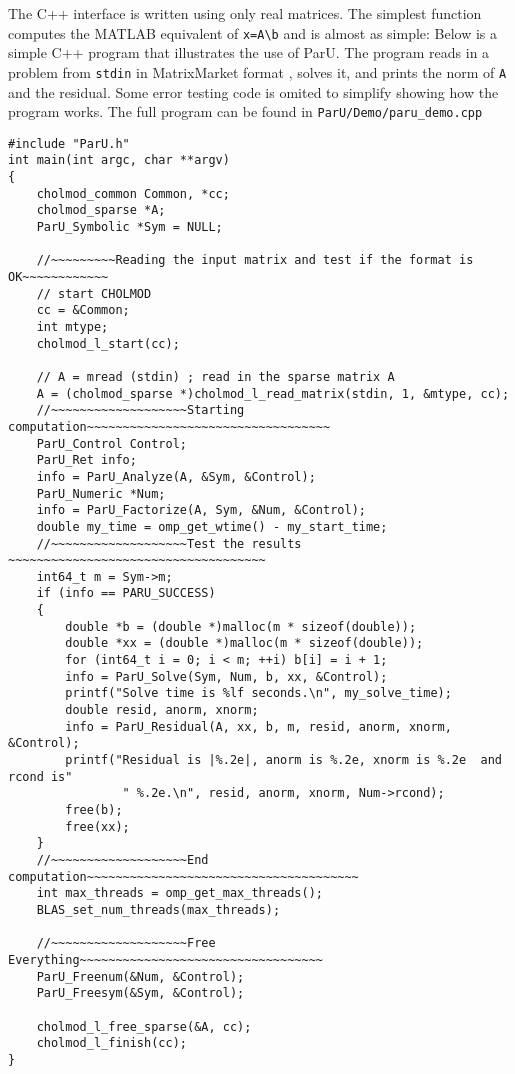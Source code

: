 \documentclass[12pt]{article}
\begin{document}
The C++ interface is written using only real matrices.  
The simplest function computes the MATLAB equivalent of
\verb'x=A\b' and is almost as simple:
Below is a simple C++ program that illustrates the use of ParU.  The
program reads in a problem from \verb'stdin' in MatrixMarket
format \cite{BoisvertPozoRemingtonBarrettDongarra97}, solves it, and prints the
norm of \verb'A' and the residual. 
Some error testing code is omited to simplify showing how the program works. 
The full program can be found in 
\verb'ParU/Demo/paru_demo.cpp'
\begin{verbatim}
#include "ParU.h"
int main(int argc, char **argv)
{
    cholmod_common Common, *cc;
    cholmod_sparse *A;
    ParU_Symbolic *Sym = NULL;

    //~~~~~~~~~Reading the input matrix and test if the format is OK~~~~~~~~~~~~
    // start CHOLMOD
    cc = &Common;
    int mtype;
    cholmod_l_start(cc);

    // A = mread (stdin) ; read in the sparse matrix A
    A = (cholmod_sparse *)cholmod_l_read_matrix(stdin, 1, &mtype, cc);
    //~~~~~~~~~~~~~~~~~~~Starting computation~~~~~~~~~~~~~~~~~~~~~~~~~~~~~~~~~~
    ParU_Control Control;
    ParU_Ret info;
    info = ParU_Analyze(A, &Sym, &Control);
    ParU_Numeric *Num;
    info = ParU_Factorize(A, Sym, &Num, &Control);
    double my_time = omp_get_wtime() - my_start_time;
    //~~~~~~~~~~~~~~~~~~~Test the results ~~~~~~~~~~~~~~~~~~~~~~~~~~~~~~~~~~~~
    int64_t m = Sym->m;
    if (info == PARU_SUCCESS)
    {
        double *b = (double *)malloc(m * sizeof(double));
        double *xx = (double *)malloc(m * sizeof(double));
        for (int64_t i = 0; i < m; ++i) b[i] = i + 1;
        info = ParU_Solve(Sym, Num, b, xx, &Control);
        printf("Solve time is %lf seconds.\n", my_solve_time);
        double resid, anorm, xnorm;
        info = ParU_Residual(A, xx, b, m, resid, anorm, xnorm, &Control);
        printf("Residual is |%.2e|, anorm is %.2e, xnorm is %.2e  and rcond is"
                " %.2e.\n", resid, anorm, xnorm, Num->rcond);
        free(b);
        free(xx);
    }
    //~~~~~~~~~~~~~~~~~~~End computation~~~~~~~~~~~~~~~~~~~~~~~~~~~~~~~~~~~~~~
    int max_threads = omp_get_max_threads();
    BLAS_set_num_threads(max_threads);

    //~~~~~~~~~~~~~~~~~~~Free Everything~~~~~~~~~~~~~~~~~~~~~~~~~~~~~~~~~~
    ParU_Freenum(&Num, &Control);
    ParU_Freesym(&Sym, &Control);

    cholmod_l_free_sparse(&A, cc);
    cholmod_l_finish(cc);
}
\end{verbatim}
\end{document}
